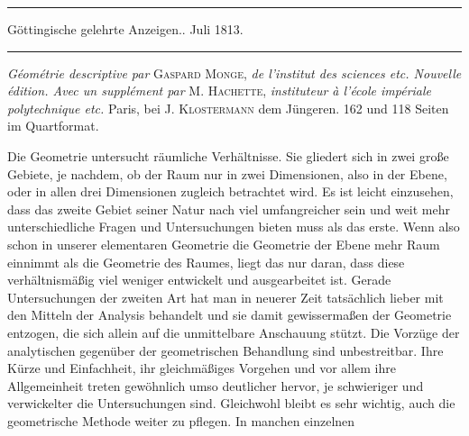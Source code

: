\begin{center}
\rule{.85\textwidth}{.3pt}\par
Göttingische gelehrte Anzeigen.. Juli 1813.\par
\rule{.85\textwidth}{.3pt}
\end{center}
\hspace*{\parindent}\textit{Géométrie descriptive par} \textsc{Gaspard Monge}, \textit{de l’institut des sciences etc. Nouvelle édition. Avec un supplément par} \textsc{M. Hachette}, \textit{instituteur à l’école impériale polytechnique etc.} Paris, bei \textsc{J. Klostermann} dem Jüngeren. 162 und 118 Seiten im Quartformat.

Die Geometrie untersucht räumliche Verhältnisse. Sie gliedert sich in zwei große Gebiete, je nachdem, ob der Raum nur in zwei Dimensionen, also in der Ebene, oder in allen drei Dimensionen zugleich betrachtet wird. Es ist leicht einzusehen, dass das zweite Gebiet seiner Natur nach viel umfangreicher sein und weit mehr unterschiedliche Fragen und Untersuchungen bieten muss als das erste. Wenn also schon in unserer elementaren Geometrie die Geometrie der Ebene mehr Raum einnimmt als die Geometrie des Raumes, liegt das nur daran, dass diese verhältnismäßig viel weniger entwickelt und ausgearbeitet ist. Gerade Untersuchungen der zweiten Art hat man in neuerer Zeit tatsächlich lieber mit den Mitteln der Analysis behandelt und sie damit gewissermaßen der Geometrie entzogen, die sich allein auf die unmittelbare Anschauung stützt. Die Vorzüge der analytischen gegenüber der geometrischen Behandlung sind unbestreitbar. Ihre Kürze und Einfachheit, ihr gleichmäßiges Vorgehen und vor allem ihre Allgemeinheit treten gewöhnlich umso deutlicher hervor, je schwieriger und verwickelter die Untersuchungen sind. Gleichwohl bleibt es sehr wichtig, auch die geometrische Methode weiter zu pflegen. In manchen einzelnen %
